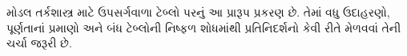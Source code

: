 \documentclass[../../../include/open-logic-chapter]{subfiles}
\begin{document}

\begin{editorial}
  મોડલ તર્કશાસ્ત્ર માટે ઉપસર્ગવાળા ટેબ્લો પરનું આ પ્રારૂપ પ્રકરણ છે.
  તેમાં વધુ ઉદાહરણો, પૂર્ણતાનાં પ્રમાણો અને બંધ ટેબ્લોની નિષ્ફળ
  શોધમાંથી પ્રતિનિદર્શનો કેવી રીતે મેળવવાં તેની ચર્ચા જરૂરી છે.
\end{editorial}


\OLEndChapterHook
\end{document}
